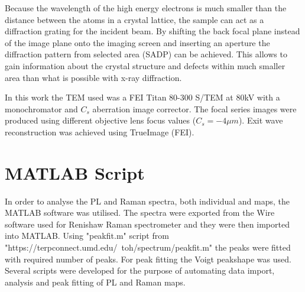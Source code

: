 Because the wavelength of the high energy electrons is much smaller than the distance between the atoms in a crystal lattice, the sample can act as a diffraction grating for the incident beam. By shifting the back focal plane instead of the image plane onto the imaging screen and inserting an aperture the diffraction pattern from selected area (SADP) can be achieved. This allows to gain information about the crystal structure and defects within much smaller area than what is possible with x-ray diffraction.

In this work the TEM used was a FEI Titan 80-300 S/TEM at 80kV with a monochromator and $C_s$ aberration image corrector. The focal series images were produced using different objective lens focus values ($C_s = -4\mu m$). Exit wave reconstruction was achieved using TrueImage (FEI).

\section{MATLAB Script}

In order to analyse the PL and Raman spectra, both individual and maps, the MATLAB software was utilised. The spectra were exported from the Wire software used for Renishaw Raman spectrometer and they were then imported into MATLAB. Using "peakfit.m" script from "https://terpconnect.umd.edu/~toh/spectrum/peakfit.m" the peaks were fitted with required number of peaks. For peak fitting the Voigt peakshape was used. Several scripts were developed for the purpose of automating data import, analysis and peak fitting of PL and Raman maps.